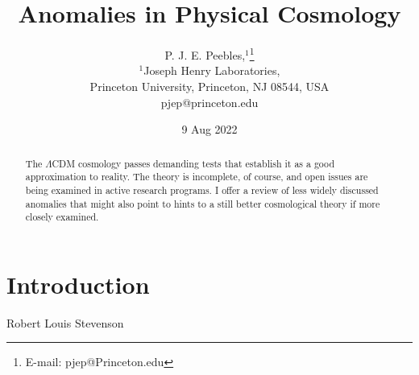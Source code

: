 \documentclass[fleqn,12pt]{article}
\begin{document}
\title{Anomalies in Physical Cosmology}
\author{P. J. E. Peebles,$^{1}$\thanks{E-mail: pjep@Princeton.edu}\\
$^{1}$Joseph Henry Laboratories, \\
Princeton University, Princeton, NJ 08544, USA\\
pjep@princeton.edu
}
\date{9 Aug 2022}

\setcounter{tocdepth}{3}

\maketitle 
\begin{abstract} 
The $\Lambda$CDM cosmology passes demanding tests that establish it as a good approximation to reality. The theory is incomplete, of course, and open issues are being examined in active research programs. I offer a review of less widely discussed anomalies that might also point to hints to a still better cosmological theory if more closely examined.
\end{abstract}


\section{\bf Introduction}\label{intro}



{\qquad\qquad\qquad\qquad Robert Louis Stevenson}\medskip
\end{document}
